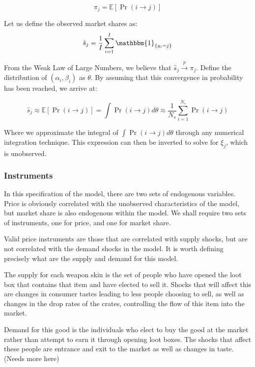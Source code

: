 \documentclass[12pt]{paper}
\newcommand{\plim}{ \overset{p}{\to} }
\newcommand{\exV}[1]{\mathbb{E} \left [ #1 \right ]}
\newcommand{\indicate}[1]{ \mathbbm{1}_{\{#1\}}}
\begin{document}
\begin{equation*}
  \pi_j = \exV{ \Pr( i \rightarrow j )}
\end{equation*}

Let us define the observed market shares as:
\begin{equation*}
  \hat{s}_j = \frac{1}{I} \sum_{i = 1}^I \indicate{y_i = j}
\end{equation*}

From the Weak Law of Large Numbers, we believe that $\hat{s}_j \plim
\pi_j$. Define the distribution of $(\alpha_i, \beta_i)$ as $\theta$. By assuming that
this convergence in probability has been reached, we arrive at:

\begin{equation*}
  \hat{s}_j \approx \exV{ \Pr( i \rightarrow j )} = \int \Pr( i \rightarrow j) d\theta \approx \frac{1}{N_s}
  \sum_{i=1}^{N_s} \Pr( i \rightarrow j)
\end{equation*}

Where we approximate the integral of $\int \Pr( i \rightarrow j)d\theta$ through any
numerical integration technique. This expression can then be inverted
to solve for $\xi_j$, which is unobserved.

\subsubsection{Instruments}

In this specification of the model, there are two sets of endogenous
variables. Price is obviously correlated with the unobserved
characteristics of the model, but market share is also endogenous
within the model. We shall require two sets of instruments, one for
price, and one for market share.

Valid price instruments are those that are correlated with supply
shocks, but are not correlated with the demand shocks in the
model. It is worth defining precisely what are the supply and demand
for this model.

The supply for each weapon skin is the set of people who have opened
the loot box that contains that item and have elected to sell
it. Shocks that will affect this are changes in consumer tastes
leading to less people choosing to sell, as well as changes in the
drop rates of the crates, controlling the flow of this item into the
market.

Demand for this good is the individuals who elect to buy the good at
the market rather than attempt to earn it through opening loot
boxes. The shocks that affect these people are entrance and exit to
the market as well as changes in taste. (Needs more here)
\end{document}
